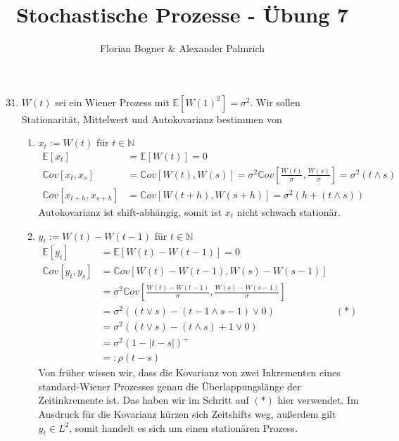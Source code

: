 \documentclass[a4paper,11pt,notitlepage,fullpage]{article}
\newcommand{\Ee}[1]{\mathbb E\left[#1\right]}
\newcommand{\Cov}[1]{\mathbb Cov\left[#1\right]}
\begin{document}
\author{Florian Bogner \& Alexander Palmrich}
\title{Stochastische Prozesse - Übung 7}
\maketitle

\begin{enumerate}
\setcounter{enumi}{30}


\item $W(t)$ sei ein Wiener Prozess mit $\Ee{W(1)^2}=\sigma^2$. Wir sollen Stationarität, Mittelwert und Autokovarianz bestimmen von
\begin{enumerate}
\item $x_t := W(t)$ für $t\in \mathbb{N}$
\begin{align*}
\Ee{x_t} &= \Ee{W(t)} = 0\\
\Cov{x_t, x_s} &= \Cov{W(t),W(s)} = \sigma^2\Cov{\frac{W(t)}{\sigma},\frac{W(s)}{\sigma}} = \sigma^2 (t\wedge s)\\
\Cov{x_{t+h}, x_{s+h}} &= \Cov{W(t+h),W(s+h)} = \sigma^2 \left(h + (t\wedge s) \right)
\end{align*}
Autokovarianz ist shift-abhängig, somit ist $x_t$ nicht schwach stationär.

\item $y_t := W(t)-W(t-1)$ für $t\in \mathbb{N}$
\begin{align*}
\Ee{y_t} &= \Ee{W(t)-W(t-1)} = 0\\
\Cov{y_t, y_s} &= \Cov{W(t)-W(t-1),W(s)-W(s-1)}\\
 &=\sigma^2\Cov{\frac{W(t)-W(t-1)}{\sigma},\frac{W(s)-W(s-1)}{\sigma}}\\
 &= \sigma^2 \left((t \lor s)-(t-1 \land s-1) \lor 0 \right) &(*)\\
 &= \sigma^2 \left((t \lor s)-(t \land s) +1 \lor 0 \right)\\
 &= \sigma^2 \left(1-|t-s| \right)^+\\
 &=: \rho(t-s)
\end{align*}
Von früher wissen wir, dass die Kovarianz von zwei Inkrementen eines standard-Wiener Prozesses genau die Überlappungslänge der Zeitinkremente ist. Das haben wir im Schritt auf $(*)$ hier verwendet. Im Ausdruck für die Kovarianz kürzen sich Zeitshifts weg, außerdem gilt $y_t \in L^2$, somit handelt es sich um einen stationären Prozess.


\end{enumerate}
\end{enumerate}
\end{document}
